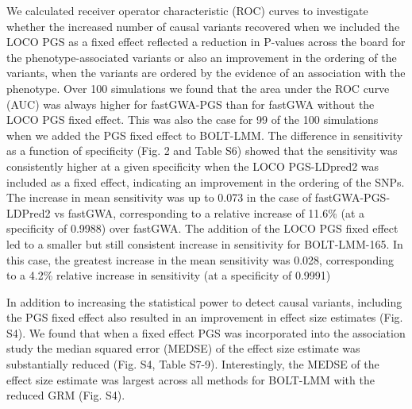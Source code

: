 \documentclass[fleqn,10pt]{wlscirep}
\begin{document}
\par We calculated receiver operator characteristic (ROC) curves to investigate whether the increased number of causal variants recovered when we included the LOCO PGS as a fixed effect reflected a reduction in P-values across the board for the phenotype-associated variants or also an improvement in the ordering of the variants, when the variants are ordered by the evidence of an association with the phenotype. Over 100 simulations we found that the area under the ROC curve (AUC) was always higher for fastGWA-PGS than for fastGWA without the LOCO PGS fixed effect. This was also the case for 99 of the 100 simulations when we added the PGS fixed effect to BOLT-LMM. The difference in sensitivity as a function of specificity (Fig. 2 and Table S6) showed that the sensitivity was consistently higher at a given specificity when the LOCO PGS-LDpred2 was included as a fixed effect, indicating an improvement in the ordering of the SNPs. The increase in mean sensitivity was up to 0.073 in the case of fastGWA-PGS-LDPred2 vs fastGWA, corresponding to a relative increase of 11.6\% (at a specificity of 0.9988) over fastGWA. The addition of the LOCO PGS fixed effect led to a smaller but still consistent increase in sensitivity for BOLT-LMM-165. In this case, the greatest increase in the mean sensitivity was 0.028, corresponding to a 4.2\% relative increase in sensitivity (at a specificity of 0.9991) 


In addition to increasing the statistical power to detect causal variants, including the PGS fixed effect also resulted in an improvement in effect size estimates (Fig. S4). We found that when a fixed effect PGS was incorporated into the association study the median squared error (MEDSE) of the effect size estimate was substantially reduced (Fig. S4, Table S7-9). Interestingly, the MEDSE of the effect size estimate was largest across all methods for BOLT-LMM with the reduced GRM (Fig. S4).

\end{document}
